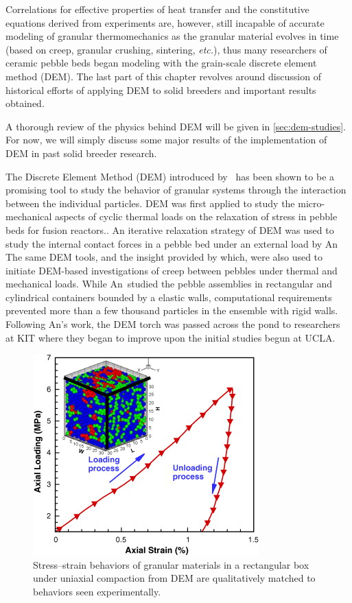 Correlations for effective properties of heat transfer and the constitutive equations derived from experiments are, however, still incapable of accurate modeling of granular thermomechanics as the granular material evolves in time (based on creep, granular crushing, sintering, \textit{etc.}), thus many researchers of ceramic pebble beds began modeling with the grain-scale discrete element method (DEM). The last part of this chapter revolves around discussion of historical efforts of applying DEM to solid breeders and important results obtained.

A thorough review of the physics behind DEM will be given in \cref{sec:dem-studies}. For now, we will simply discuss some major results of the implementation of DEM in past solid breeder research.

The Discrete Element Method (DEM) introduced by~\cite{Cundall1979} has been shown to be a promising tool to study the behavior of granular systems through the interaction between the individual particles. DEM was first applied to study the micro-mechanical aspects of cyclic thermal loads on the relaxation of stress in pebble beds for fusion reactors.\cite{Lu2000b,Ying2002}. An iterative relaxation strategy of DEM was used to study the internal contact forces in a pebble bed under an external load by An\etal\cite{An20072233} The same DEM tools, and the insight provided by which, were also used to initiate DEM-based investigations of creep between pebbles under thermal and mechanical loads.\cite{An20071393} While An\etal~studied the pebble assemblies in rectangular and cylindrical containers bounded by a elastic walls, computational requirements prevented more than a few thousand particles in the ensemble with rigid walls.\cite{An20072233} Following An's work, the DEM torch was passed across the pond to researchers at KIT where they began to improve upon the initial studies begun at UCLA.

\begin{figure}[!ht]
    \centering
    \includegraphics[width=\singleimagewidth]{figures/1-s2.0-S092037960700049X-gr1.jpg}
    \caption{Stress–strain behaviors of granular materials in a rectangular box under uniaxial compaction from DEM are qualitatively matched to behaviors seen experimentally.}
\label{fig:an-uniaxial-compression}
\end{figure}

